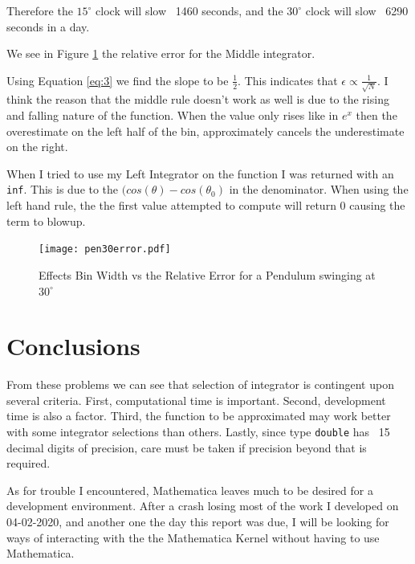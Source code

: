 \documentclass{article}
\begin{document}
Therefore the $15^\circ$ clock will slow ~1460 seconds, and the $30^\circ$ clock will slow ~6290 seconds in a day.

\bigskip
{}
\medskip

We see in Figure \ref{fig:3} the relative error for the Middle integrator.

Using Equation \ref{eq:3} we find the slope to be $\frac{1}{2}$. This indicates that $\epsilon \propto \frac{1}{\sqrt{N}}$.
I think the reason that the middle rule doesn't work as well is due to the rising and falling nature of the function. When the value only rises like in $e^x$ then the overestimate on the left half of the bin, approximately cancels the underestimate on the right.

When I tried to use my Left Integrator on the function I was returned with an \texttt{inf}. This is due to the $(cos(\theta)-cos(\theta_0)$ in the denominator. When using the left hand rule, the the first value attempted to compute will return $0$ causing the term to blowup.

\begin{figure}[ht]\label{fig:3}
\begin{center}
\texttt{[image: pen30error.pdf]}
\end{center}
\caption{Effects Bin Width vs the Relative Error for a Pendulum swinging at $30^\circ$}
\end{figure}

\section{Conclusions}

From these problems we can see that selection of integrator is contingent upon several criteria. First, computational time is important. Second, development time is also a factor. Third, the function to be approximated may work better with some integrator selections than others. Lastly, since type \texttt{double} has ~15 decimal digits of precision, care must be taken if precision beyond that is required.

As for trouble I encountered, Mathematica leaves much to be desired for a development environment. After a crash losing most of the work I developed on 04-02-2020, and another one the day this report was due, I will be looking for ways of interacting with the the Mathematica Kernel without having to use Mathematica.
\end{document}

